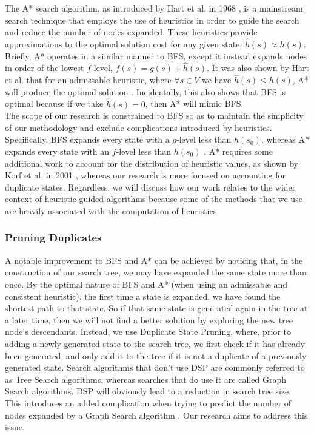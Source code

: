 \documentclass{article}
\begin{document}
The A* search algorithm, as introduced by Hart et al. in 1968 \cite{hart1968formal},
is a mainstream search technique that
employs the use of heuristics in order to guide the search and reduce the number of nodes expanded.
These heuristics provide approximations to the optimal solution cost for any given state,
\(\hat{h}(s) \approx h(s)\).
Briefly, A* operates in a similar manner to BFS,
except it instead expands nodes in order of the lowest \(f\)-level, \(f(s) = g(s) + \hat{h}(s)\).
It was also shown by Hart et al. that for an admissable heuristic,
where \(\forall s \in V\) we have \(\hat{h}(s) \leq h(s)\),
A* will produce the optimal solution \cite{hart1968formal}.
Incidentally, this also shows that BFS is optimal because
if we take \(\hat{h}(s) = 0\), then A* will mimic BFS. \\

The scope of our research is constrained to BFS so as to
maintain the simplicity of our methodology and exclude complications introduced by heuristics.
Specifically, BFS expands every state with a \(g\)-level less than \(h(s_0)\), whereas
A* expands every state with an \(f\)-level less than \(h(s_0)\) \cite{pearl1984heuristics}.
A* requires some additional work to account for the distribution of heuristic values, as shown by Korf et al. in 2001 \cite{korf2001time},
whereas our research is more focused on accounting for duplicate states.
Regardless, we will discuss how our work relates to the wider context of heuristic-guided algorithms
because some of the methods that we use are heavily associated with the computation of heuristics.

\subsubsection*{Pruning Duplicates}
A notable improvement to BFS and A* can be achieved by noticing that,
in the construction of our search tree,
we may have expanded the same state more than once.
By the optimal nature of BFS and A* (when using an admissable and consistent heuristic),
the first time a state is expanded,
we have found the shortest path to that state.
So if that same state is generated again in the tree at a later time,
then we will not find a better solution by exploring the new tree node's descendants.
Instead, we use Duplicate State Pruning,
where,
prior to adding a newly generated state to the search tree,
we first check if it has already been generated,
and only add it to the tree if it is not a duplicate of a previously generated state.
Search algorithms that don't use DSP are commonly referred to as Tree Search algorithms,
whereas searches that do use it are called Graph Search algorithms.
DSP will obviously lead to a reduction in search tree size.
This introduces an added complication when trying to predict the number of nodes expanded
by a Graph Search algorithm \cite{lelis2014estimating}.
Our research aims to address this issue. \\
\end{document}

